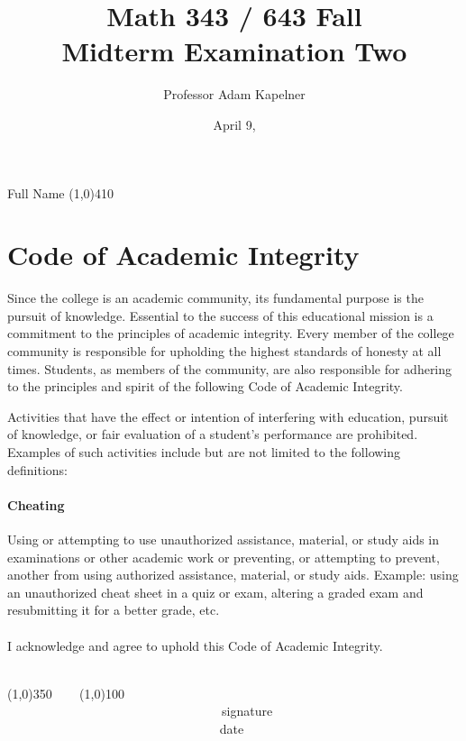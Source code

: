\documentclass[12pt]{article}
\title{Math 343 / 643 Fall \the\year{} \\ Midterm Examination Two}
\author{Professor Adam Kapelner}
\date{April 9, \the\year{}}
\begin{document}
\maketitle

\noindent Full Name \line(1,0){410}

\thispagestyle{empty}

\section*{Code of Academic Integrity}

\footnotesize
Since the college is an academic community, its fundamental purpose is the pursuit of knowledge. Essential to the success of this educational mission is a commitment to the principles of academic integrity. Every member of the college community is responsible for upholding the highest standards of honesty at all times. Students, as members of the community, are also responsible for adhering to the principles and spirit of the following Code of Academic Integrity.

Activities that have the effect or intention of interfering with education, pursuit of knowledge, or fair evaluation of a student's performance are prohibited. Examples of such activities include but are not limited to the following definitions:

\paragraph{Cheating} Using or attempting to use unauthorized assistance, material, or study aids in examinations or other academic work or preventing, or attempting to prevent, another from using authorized assistance, material, or study aids. Example: using an unauthorized cheat sheet in a quiz or exam, altering a graded exam and resubmitting it for a better grade, etc.\\
\\
\noindent I acknowledge and agree to uphold this Code of Academic Integrity. \\~\\

\begin{center}
\line(1,0){350} ~~~ \line(1,0){100}\\
~~~~~~~~~~~~~~~~~~~~~~~~~~~~~~~~~~signature~~~~~~~~~~~~~~~~~~~~~~~~~~~~~~~~~~~~~~~~~~~~~~~~~~~~~~~~~~~~~~ date
\end{center}

\normalsize
\end{document}
